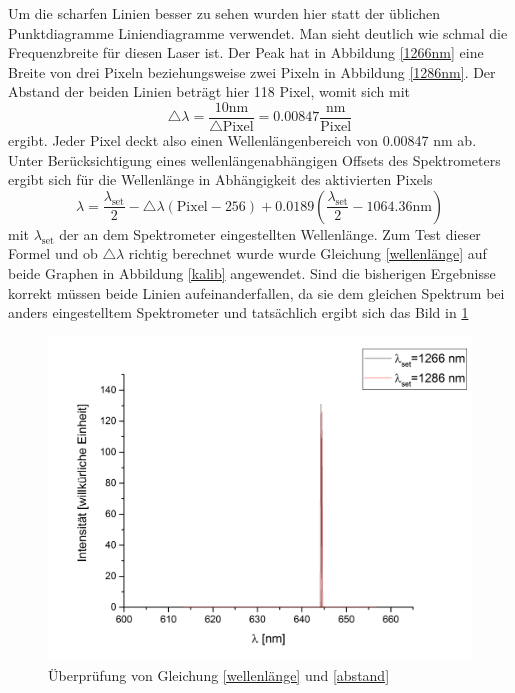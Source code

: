 Um die scharfen Linien besser zu sehen wurden hier statt der üblichen Punktdiagramme Liniendiagramme verwendet. Man sieht deutlich wie schmal die Frequenzbreite für diesen Laser ist. Der Peak hat in Abbildung \ref{1266nm} eine Breite von drei Pixeln beziehungsweise zwei Pixeln in Abbildung \ref{1286nm}. Der Abstand der beiden Linien beträgt hier 118 Pixel, womit sich mit 
\begin{equation}
\triangle\lambda=\frac{10\text{nm}}{\triangle\text{Pixel}}=0.00847 \frac{\text{nm}}{\text{Pixel}}
\label{abstand}
\end{equation}
ergibt. Jeder Pixel deckt also einen Wellenlängenbereich von 0.00847 nm ab. Unter Berücksichtigung eines wellenlängenabhängigen Offsets des Spektrometers ergibt sich für die Wellenlänge in Abhängigkeit des aktivierten Pixels
\begin{equation}
\lambda=\frac{\lambda_{\text{set}}}{2}-\triangle\lambda(\text{Pixel}-256)+0.0189\left(\frac{\lambda_{\text{set}}}{2}-1064.36\text{nm}\right)
\label{wellenlänge}
\end{equation}
mit $\lambda_{\text{set}}$ der an dem Spektrometer eingestellten Wellenlänge. Zum Test dieser Formel und ob $\triangle\lambda$ richtig berechnet wurde wurde Gleichung \ref{wellenlänge} auf beide Graphen in Abbildung \ref{kalib} angewendet. Sind die bisherigen Ergebnisse korrekt müssen beide Linien aufeinanderfallen, da sie dem gleichen Spektrum bei anders eingestelltem Spektrometer und tatsächlich ergibt sich das Bild in \ref{test}
\begin{figure}[H]
	\begin{center}
		\includegraphics[scale=.5]{Bilder/Test.png}
		\caption{Überprüfung von Gleichung \ref{wellenlänge} und \ref{abstand}}
		\label{test}
	\end{center}
\end{figure}
